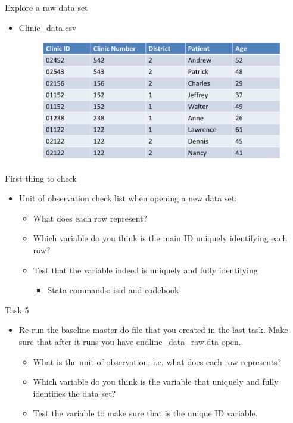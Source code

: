 \documentclass[aspectratio=169]{beamer}
\begin{document}
\begin{frame}{Explore a raw data set}
\begin{itemize}
	\item Clinic\_data.csv
	
	\begin{figure}
		\centering
		\includegraphics[width=\linewidth]{img/raw2}
	\end{figure}
\end{itemize}
\end{frame}


\begin{frame}{First thing to check}
\begin{itemize}
	\item Unit of observation check list when opening a new data set:
	\begin{itemize}
		\item What does each row represent?
		\item Which variable do you think is the main ID uniquely identifying each row?
		\item Test that the variable indeed is uniquely and fully identifying
			\begin{itemize}
				\item Stata commands: isid and codebook
			\end{itemize}		
	\end{itemize}
\end{itemize}
\end{frame}


\begin{frame}{Task 5}
\begin{itemize}
	\item Re-run the baseline master do-file that you created in the last task. Make sure that after it runs you have  endline\_data\_raw.dta open.
	\begin{itemize}
		\item What is the unit of observation, i.e. what does each row represents?		
		\item Which variable do you think is the variable that uniquely and fully identifies the data set?		
		\item Test the variable to make sure that is the unique ID variable.
	\end{itemize}
\end{itemize}
\end{frame}
\end{document}
